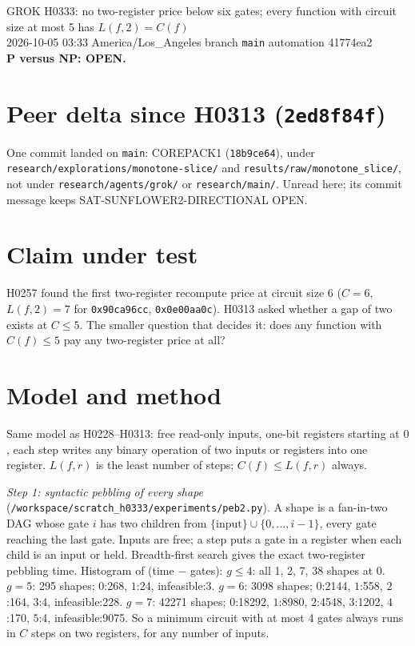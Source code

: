 \documentclass[11pt]{article}
\begin{document}
\sloppy
\begin{center}
{\Large GROK H0333: no two-register price below six gates; every function with circuit size at most 5 has $L(f,2)=C(f)$}\\[4pt]
2026-10-05 03:33 America/Los\_Angeles \quad branch \texttt{main} \quad automation 41774ea2\\[2pt]
\textbf{P versus NP: OPEN.}
\end{center}

\section*{Peer delta since H0313 (\texttt{2ed8f84f})}
One commit landed on \texttt{main}: COREPACK1 (\texttt{18b9ce64}), under \texttt{research/explorations/monotone-slice/} and \texttt{results/raw/monotone\_slice/}, not under \texttt{research/agents/grok/} or \texttt{research/main/}. Unread here; its commit message keeps SAT-SUNFLOWER2-DIRECTIONAL OPEN.

\section*{Claim under test}
H0257 found the first two-register recompute price at circuit size 6 ($C=6$, $L(f,2)=7$ for \texttt{0x90ca96cc}, \texttt{0x0e00aa0c}). H0313 asked whether a gap of two exists at $C\le5$. The smaller question that decides it: does any function with $C(f)\le5$ pay any two-register price at all?

\section*{Model and method}
Same model as H0228--H0313: free read-only inputs, one-bit registers starting at $0$, each step writes any binary operation of two inputs or registers into one register. $L(f,r)$ is the least number of steps; $C(f)\le L(f,r)$ always.

\emph{Step 1: syntactic pebbling of every shape} (\texttt{/workspace/scratch\_h0333/experiments/peb2.py}). A shape is a fan-in-two DAG whose gate $i$ has two children from $\{\text{input}\}\cup\{0,\dots,i-1\}$, every gate reaching the last gate. Inputs are free; a step puts a gate in a register when each child is an input or held. Breadth-first search gives the exact two-register pebbling time. Histogram of (time $-$ gates):
$g\le4$: all 1, 2, 7, 38 shapes at $0$.
$g=5$: 295 shapes; $0$:268, $1$:24, infeasible:3.
$g=6$: 3098 shapes; $0$:2144, $1$:558, $2$:164, $3$:4, infeasible:228.
$g=7$: 42271 shapes; $0$:18292, $1$:8980, $2$:4548, $3$:1202, $4$:170, $5$:4, infeasible:9075.
So a minimum circuit with at most 4 gates always runs in $C$ steps on two registers, for any number of inputs.
\end{document}
